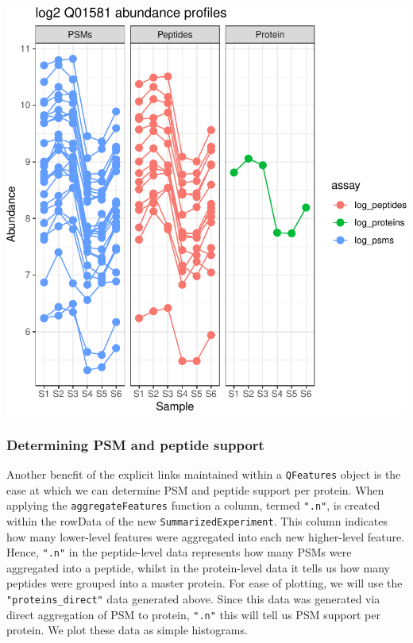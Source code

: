 \documentclass[9pt,a4paper,]{extarticle}
\begin{document}
\begin{center}\includegraphics[width=0.8\linewidth]{workflow_expressions_files/figure-latex/qfeatures_links_plots-1} \end{center}

\hypertarget{determining-psm-and-peptide-support}{%
\subsubsection{Determining PSM and peptide support}\label{determining-psm-and-peptide-support}}

Another benefit of the explicit links maintained within a \texttt{QFeatures} object is
the ease at which we can determine PSM and peptide support per protein. When
applying the \texttt{aggregateFeatures} function a column, termed \texttt{".n"}, is created
within the rowData of the new \texttt{SummarizedExperiment}. This column indicates how
many lower-level features were aggregated into each new higher-level feature.
Hence, \texttt{".n"} in the peptide-level data represents how many PSMs were aggregated
into a peptide, whilst in the protein-level data it tells us how many peptides
were grouped into a master protein. For ease of plotting, we will use the
\texttt{"proteins\_direct"} data generated above. Since this data was generated via
direct aggregation of PSM to protein, \texttt{".n"} this will tell us PSM support per
protein. We plot these data as simple histograms.
\end{document}
